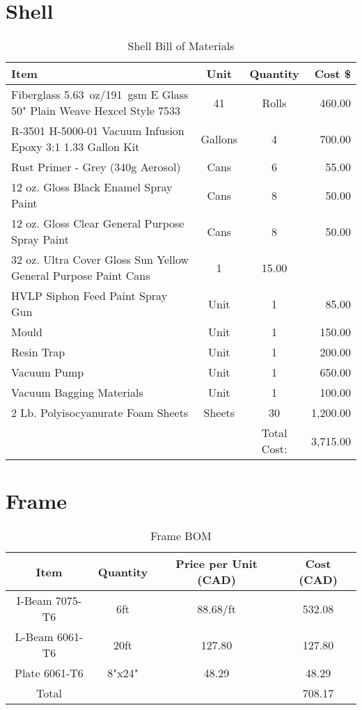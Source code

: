 \documentclass[main.tex]{subfiles}
\begin{document}
\section{Shell}
\begin{table}[H]
\centering
  \begin{tabular}{@{}l c c r@{}} \toprule
    Item & Unit & Quantity & Cost \$ \\ \midrule
    Fiberglass \SI{5.63}{oz}/\SI{191}{gsm} E Glass 50" Plain Weave Hexcel Style 7533 & 41 & Rolls & 460.00 \\
    R-3501 H-5000-01 Vacuum Infusion Epoxy 3:1 1.33 Gallon Kit & Gallons & 4 & 700.00\\
    Rust Primer - Grey (340g Aerosol) & Cans & 6 & 55.00\\
    12 oz. Gloss Black Enamel Spray Paint & Cans & 8 & 50.00\\
    12 oz. Gloss Clear General Purpose Spray Paint & Cans & 8 & 50.00\\
    32 oz. Ultra Cover Gloss Sun Yellow General Purpose Paint Cans & 1 & 15.00\\
    HVLP Siphon Feed Paint Spray Gun & Unit & 1 & 85.00 \\
    Mould & Unit & 1 & 150.00 \\
    Resin Trap & Unit & 1 & 200.00 \\
    Vacuum Pump & Unit & 1 & 650.00 \\
    Vacuum Bagging Materials & Unit & 1 & 100.00 \\
    2 Lb. Polyisocyanurate Foam Sheets & Sheets & 30 & 1,200.00 \\
    \midrule
     & & Total Cost: & 3,715.00\\
     \bottomrule
  \end{tabular}
  \caption{Shell Bill of Materials}
  \label{table:shellmoney}
\end{table}
\section{Frame}
\begin{table}[H]
    \centering
    \begin{tabular}{cccc}

    \toprule

    Item & Quantity & Price per Unit (CAD) & Cost (CAD) \\
    \midrule

    I-Beam 7075-T6 & 6ft & 88.68/ft & 532.08\\
    L-Beam 6061-T6 & 20ft & 127.80 & 127.80\\
    Plate 6061-T6 & 8"x24" & 48.29 & 48.29\\

\midrule
Total & & & 708.17\\
    \bottomrule

	\end{tabular}
    \caption{Frame BOM}
    \label{table:frame-bom}
\end{table}
\end{document}
